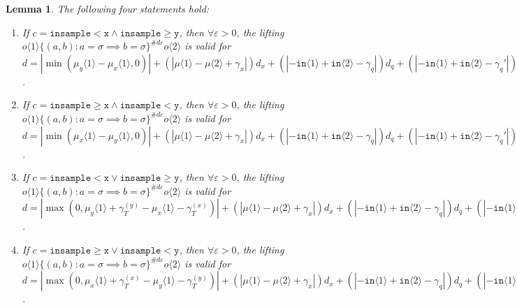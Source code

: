 \documentclass[12pt]{article}
\newcommand{\gguard}[1][x]{\texttt{insample}\geq #1}
\newcommand{\lguard}[1][x]{\texttt{insample} < #1}
\newcommand{\brangle}[1]{\langle #1 \rangle}
\newtheorem{lemma}[thm]{Lemma}
\theoremstyle{definition}
\begin{document}
\begin{lemma}
    The following four statements hold:\begin{enumerate}
        \item If $c = \lguard[\texttt{x}] \land \gguard[\texttt{y}]$, then $\forall \varepsilon>0$, the lifting $o\brangle{1}\{(a, b): a=\sigma\implies b=\sigma\}^{\#d\varepsilon}o\brangle{2}$ is valid for $d = |\min(\mu_y\brangle{1}-\mu_x\brangle{1}, 0)|+(|\mu\brangle{1}-\mu\brangle{2}+\gamma_x|)d_x+(|-\texttt{in}\brangle{1}+\texttt{in}\brangle{2}-\gamma_q|)d_q+(|-\texttt{in}\brangle{1}+\texttt{in}\brangle{2}-\gamma_q'|)d_q'$. 
        \item If $c = \gguard[\texttt{x}] \land \lguard[\texttt{y}]$, then $\forall \varepsilon>0$, the lifting $o\brangle{1}\{(a, b): a=\sigma\implies b=\sigma\}^{\#d\varepsilon}o\brangle{2}$ is valid for $d = |\min(\mu_x\brangle{1}-\mu_y\brangle{1}, 0)|+(|\mu\brangle{1}-\mu\brangle{2}+\gamma_x|)d_x+(|-\texttt{in}\brangle{1}+\texttt{in}\brangle{2}-\gamma_q|)d_q+(|-\texttt{in}\brangle{1}+\texttt{in}\brangle{2}-\gamma_q'|)d_q'$. 
        \item If $c = \lguard[\texttt{x}] \lor \gguard[\texttt{y}]$, then $\forall \varepsilon>0$, the lifting $o\brangle{1}\{(a, b): a=\sigma\implies b=\sigma\}^{\#d\varepsilon}o\brangle{2}$ is valid for $d = |\max(0, \mu_y\brangle{1}+ \gamma_T^{(y)}-\mu_x\brangle{1}-\gamma_T^{(x)})|+(|\mu\brangle{1}-\mu\brangle{2}+\gamma_x|)d_x+(|-\texttt{in}\brangle{1}+\texttt{in}\brangle{2}-\gamma_q|)d_q+(|-\texttt{in}\brangle{1}+\texttt{in}\brangle{2}-\gamma_q'|)d_q'$. 
        \item If $c = \gguard[\texttt{x}] \lor \lguard[\texttt{y}]$, then $\forall \varepsilon>0$, the lifting $o\brangle{1}\{(a, b): a=\sigma\implies b=\sigma\}^{\#d\varepsilon}o\brangle{2}$ is valid for $d = |\max(0, \mu_x\brangle{1}+ \gamma_T^{(x)}-\mu_y\brangle{1}-\gamma_T^{(y)})|+(|\mu\brangle{1}-\mu\brangle{2}+\gamma_x|)d_x+(|-\texttt{in}\brangle{1}+\texttt{in}\brangle{2}-\gamma_q|)d_q+(|-\texttt{in}\brangle{1}+\texttt{in}\brangle{2}-\gamma_q'|)d_q'$. 
    \end{enumerate}
\end{lemma}
\end{document}
